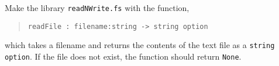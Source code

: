 \label{cat:readFile}
Make the library \lstinline{readNWrite.fs} with the function,
\begin{quote}
  \mbox{\lstinline!readFile : filename:string -> string option!}
\end{quote}
which takes a filename and returns the contents of the text file as a
\lstinline{string option}. If the file does not exist, the function
should return \lstinline{None}.
